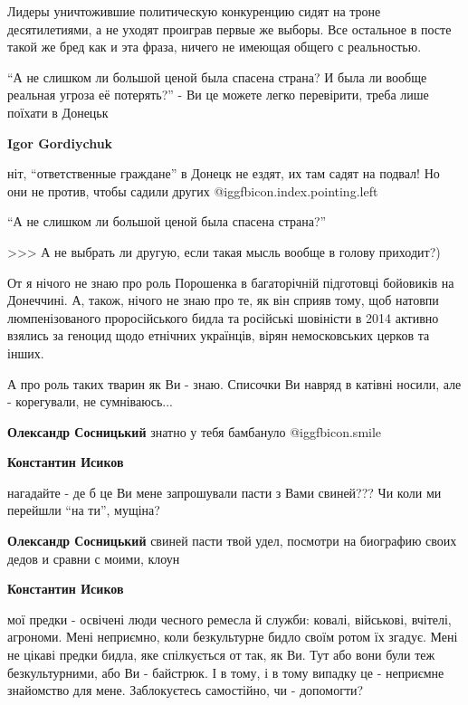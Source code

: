 \begin{itemize}
\begin{itemize}
Лидеры уничтожившие политическую конкуренцию сидят на троне десятилетиями, а не
уходят проиграв первые же выборы. Все остальное в посте такой же бред как и эта
фраза, ничего не имеющая общего с реальностью.

\end{itemize} %


\enquote{А не слишком ли большой ценой была спасена страна? И была ли вообще реальная
угроза её потерять?} - Ви це можете легко перевірити, треба лише поїхати в
Донецьк

\textbf{Igor Gordiychuk} 

ніт, \enquote{ответственные граждане} в Донецк не ездят, их там садят на подвал! Но они
не против, чтобы садили других  @igg{fbicon.index.pointing.left} 

\enquote{А не слишком ли большой ценой была спасена страна?} 

>>> А не выбрать ли другую, если такая мысль вообще в голову приходит?)


От я нічого не знаю про роль Порошенка в багаторічній підготовці бойовиків на
Донеччині. А, також, нічого не знаю про те, як він сприяв тому, щоб натовпи
люмпенізованого проросійського бидла та російські шовіністи в 2014 активно
взялись за геноцид щодо етнічних українців, вірян немосковських церков та
інших.

А про роль таких тварин як Ви - знаю. Списочки Ви навряд в катівні носили, але
- корегували, не сумніваюсь...

\begin{itemize} %
\textbf{Олександр Сосницький} знатно у тебя бамбануло  @igg{fbicon.smile} 

\textbf{Константин Исиков} 

нагадайте - де б це Ви мене запрошували пасти з Вами свиней??? Чи коли ми
перейшли \enquote{на ти}, мущіна?

\textbf{Олександр Сосницький} свиней пасти твой удел, посмотри на биографию своих дедов и сравни с моими, клоун

\textbf{Константин Исиков} 

мої предки - освічені люди чесного ремесла й служби: ковалі, військові,
вчітелі, агрономи. Мені неприємно, коли безкультурне бидло своїм ротом їх
згадує. Мені не цікаві предки бидла, яке спілкується от так, як Ви. Тут або
вони були теж безкультурними, або Ви - байстрюк. І в тому, і в тому випадку це
- неприємне знайомство для мене. Заблокуєтесь самостійно, чи - допомогти?


\end{itemize}
\end{itemize}
